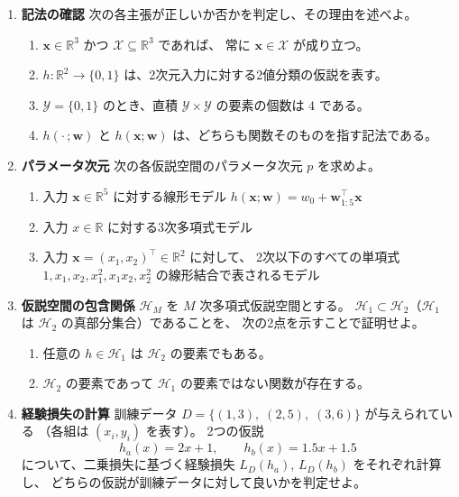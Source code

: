 \begin{enumerate}
  \item \textbf{記法の確認}\quad
    次の各主張が正しいか否かを判定し、その理由を述べよ。
    \begin{enumerate}
      \item $\bm{x} \in \mathbb{R}^3$ かつ $\mathcal{X} \subseteq \mathbb{R}^3$ であれば、
        常に $\bm{x} \in \mathcal{X}$ が成り立つ。
      \item $h : \mathbb{R}^2 \to \{0, 1\}$ は、2次元入力に対する2値分類の仮説を表す。
      \item $\mathcal{Y} = \{0, 1\}$ のとき、直積 $\mathcal{Y} \times \mathcal{Y}$ の要素の個数は $4$ である。
      \item $h(\cdot\,; \bm{w})$ と $h(\bm{x}; \bm{w})$ は、どちらも関数そのものを指す記法である。
    \end{enumerate}

  \item \textbf{パラメータ次元}\quad
    次の各仮説空間のパラメータ次元 $p$ を求めよ。
    \begin{enumerate}
      \item 入力 $\bm{x} \in \mathbb{R}^5$ に対する線形モデル $h(\bm{x}; \bm{w}) = w_0 + \bm{w}_{1:5}^\top \bm{x}$
      \item 入力 $x \in \mathbb{R}$ に対する3次多項式モデル
      \item 入力 $\bm{x} = (x_1, x_2)^\top \in \mathbb{R}^2$ に対して、
        2次以下のすべての単項式 $1, x_1, x_2, x_1^2, x_1 x_2, x_2^2$ の線形結合で表されるモデル
    \end{enumerate}

  \item \textbf{仮説空間の包含関係}\quad
    $\mathcal{H}_M$ を $M$ 次多項式仮説空間とする。
    $\mathcal{H}_1 \subset \mathcal{H}_2$（$\mathcal{H}_1$ は $\mathcal{H}_2$ の真部分集合）であることを、
    次の2点を示すことで証明せよ。
    \begin{enumerate}
      \item 任意の $h \in \mathcal{H}_1$ は $\mathcal{H}_2$ の要素でもある。
      \item $\mathcal{H}_2$ の要素であって $\mathcal{H}_1$ の要素ではない関数が存在する。
    \end{enumerate}

  \item \textbf{経験損失の計算}\quad
    訓練データ $D = \{(1, 3),\; (2, 5),\; (3, 6)\}$ が与えられている
    （各組は $(x_i, y_i)$ を表す）。
    2つの仮説
    \begin{equation*}
      h_a(x) = 2x + 1, \qquad h_b(x) = 1.5x + 1.5
    \end{equation*}
    について、二乗損失に基づく経験損失 $L_D(h_a)$, $L_D(h_b)$ をそれぞれ計算し、
    どちらの仮説が訓練データに対して良いかを判定せよ。


\end{enumerate}
